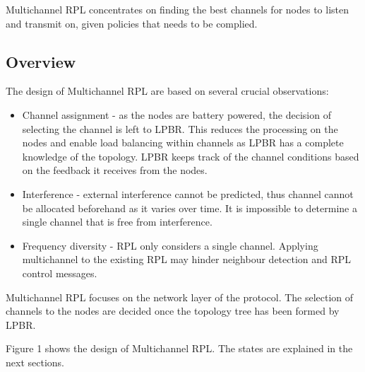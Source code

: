 
Multichannel RPL concentrates on finding the best channels for nodes to listen and transmit on, given policies that needs to be complied. 

\subsection{Overview}


The design of Multichannel RPL are based on several crucial observations:

\begin{itemize}
\item Channel assignment - as the nodes are battery powered, the decision of selecting the channel is left to LPBR. This reduces the processing on the nodes and enable load balancing within channels as LPBR has a complete knowledge of the topology. LPBR keeps track of the channel conditions based on the feedback it receives from the nodes. 

\item Interference - external interference cannot be predicted, thus channel cannot be allocated beforehand as it varies over time. It is impossible to determine a single channel that is free from interference.

\item Frequency diversity - RPL only considers a single channel. Applying multichannel to the existing RPL may hinder neighbour detection and RPL control messages.
\end{itemize}

Multichannel RPL focuses on the network layer of the protocol. The selection of channels to the nodes are decided once the topology tree has been formed by LPBR.

Figure 1 shows the design of Multichannel RPL. The states are explained in the next sections.


